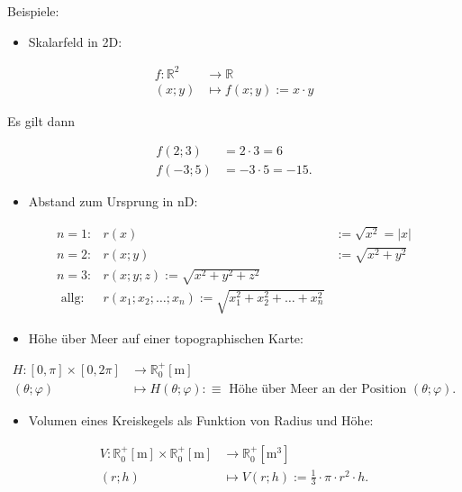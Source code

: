 \documentclass[10pt]{article}
\begin{document}
Beispiele:

\begin{itemize}
  \item Skalarfeld in 2D:
\end{itemize}


\begin{align*}
f: \mathbb{R}^{2} & \rightarrow \mathbb{R} \\
(x ; y) & \mapsto f(x ; y):=x \cdot y \tag{2.5}
\end{align*}


Es gilt dann


\begin{align*}
f(2 ; 3) & =2 \cdot 3=6  \tag{2.6}\\
f(-3 ; 5) & =-3 \cdot 5=-15 . \tag{2.7}
\end{align*}


\begin{itemize}
  \item Abstand zum Ursprung in nD:
\end{itemize}

\[
\begin{array}{rlrl}
n=1: & r(x) & :=\sqrt{x^{2}}=|x| \\
n=2: & r(x ; y) & :=\sqrt{x^{2}+y^{2}} \\
n=3: & r(x ; y ; z):=\sqrt{x^{2}+y^{2}+z^{2}} \\
\text { allg: } & r\left(x_{1} ; x_{2} ; \ldots ; x_{n}\right):=\sqrt{x_{1}^{2}+x_{2}^{2}+\ldots+x_{n}^{2}} \tag{2.11}
\end{array}
\]

\begin{itemize}
  \item Höhe über Meer auf einer topographischen Karte:
\end{itemize}


\begin{align*}
H:[0, \pi] \times[0,2 \pi] & \rightarrow \mathbb{R}_{0}^{+}[\mathrm{m}] \\
(\theta ; \varphi) & \mapsto H(\theta ; \varphi): \equiv \text { Höhe über Meer an der Position }(\theta ; \varphi) . \tag{2.12}
\end{align*}


\begin{itemize}
  \item Volumen eines Kreiskegels als Funktion von Radius und Höhe:
\end{itemize}


\begin{align*}
V: \mathbb{R}_{0}^{+}[\mathrm{m}] \times \mathbb{R}_{0}^{+}[\mathrm{m}] & \rightarrow \mathbb{R}_{0}^{+}\left[\mathrm{m}^{3}\right] \\
(r ; h) & \mapsto V(r ; h):=\frac{1}{3} \cdot \pi \cdot r^{2} \cdot h . \tag{2.13}
\end{align*}
\end{document}
